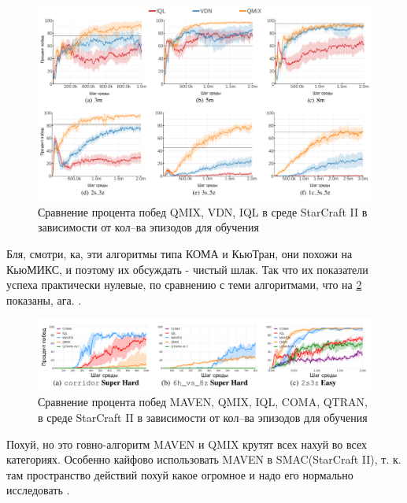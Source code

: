 \begin{figure}[H]
	\begin{center}
		\includegraphics[pages=-, width=140mm]{./inc/img/qmix_winrate.png}
		\caption{Сравнение процента побед QMIX, VDN, IQL в среде StarCraft II в зависимости от кол--ва эпизодов для обучения}
		\label{fig:qmix_winrate}
	\end{center}
\end{figure}

Бля, смотри, ка, эти алгоритмы типа КОМА и КьюТран, они похожи на КьюМИКС, и поэтому их обсуждать - чистый шлак. Так что их показатели успеха практически нулевые, по сравнению с теми алгоритмами, что на \ref{fig:maven_winrate} показаны, ага. \cite{DBLP:journals/corr/abs-1910-07483}.

\begin{figure}[H]
	\begin{center}
		\includegraphics[pages=-, width=140mm]{./inc/img/maven_winrate.png}
		\caption{Сравнение процента побед MAVEN, QMIX, IQL, COMA, QTRAN, в среде StarCraft II в зависимости от кол--ва эпизодов для обучения}
		\label{fig:maven_winrate}
	\end{center}
\end{figure}

Похуй, но это говно-алгоритм MAVEN и QMIX крутят всех нахуй во всех категориях. Особенно кайфово использовать MAVEN в SMAC(StarCraft II), т. к. там пространство действий похуй какое огромное и надо его нормально исследовать \cite{DBLP:journals/corr/abs-1910-07483}.

